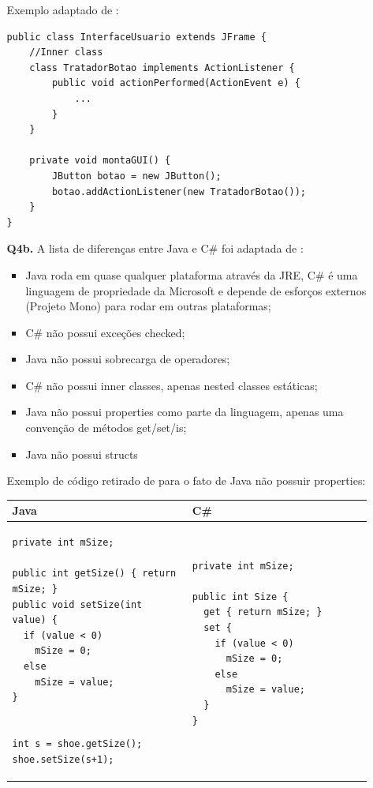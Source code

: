 \documentclass[11pt]{article}
\begin{document}
\begin{itemize}
\begin{itemize}
  Exemplo adaptado de \cite{tony:inner-classes}:
  \begin{verbatim}
public class InterfaceUsuario extends JFrame {
    //Inner class
    class TratadorBotao implements ActionListener {
        public void actionPerformed(ActionEvent e) {
            ...
        }
    }

    private void montaGUI() {
        JButton botao = new JButton();
        botao.addActionListener(new TratadorBotao());
    }
}
  \end{verbatim}
  \item[{\bf Q4b.}] 
    A lista de diferenças entre Java e C\# foi adaptada de 
    \cite{jon:differences-csharp-java}: 
    \begin{itemize}
    \item Java roda em quase qualquer plataforma através da JRE, C\# é uma
    linguagem de propriedade da Microsoft e depende de esforços externos
    (Projeto Mono) para rodar em outras plataformas;
    \item C\# não possui exceções checked;
    \item Java não possui sobrecarga de operadores;
    \item C\# não possui inner classes, apenas nested classes estáticas; 
    \item Java não possui properties como parte da linguagem, apenas uma
    convenção de métodos get/set/is;
    \item Java não possui structs
    \end{itemize}
    
    Exemplo de código retirado de \cite{frank:java-csharp-comparison} para o
    fato de Java não possuir properties:
    
    \begin{tabular}{|p{0.5\linewidth}|p{0.5\linewidth}|} \hline
    Java & C\# \\ \hline
    \begin{verbatim}
private int mSize;

public int getSize() { return mSize; }
public void setSize(int value) {
  if (value < 0)
    mSize = 0;
  else
    mSize = value;
}


int s = shoe.getSize();
shoe.setSize(s+1);
    \end{verbatim}
    &
    \begin{verbatim}
private int mSize;

public int Size {
  get { return mSize; }
  set {
    if (value < 0)
      mSize = 0;
    else
      mSize = value;
  }
}


\end{verbatim}
\end{tabular}
\end{itemize}
\end{itemize}
\end{document}
